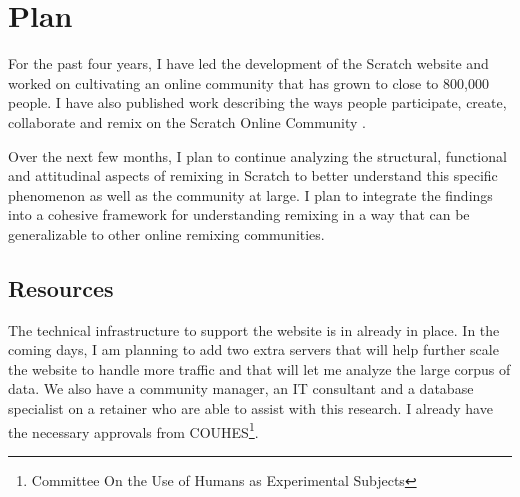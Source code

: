 \chapter{Plan}

For the past four years, I have led the development of the Scratch website and worked on cultivating an online community that has grown to close to 800,000 people.
I have also published work describing the ways people participate, create, collaborate and remix on the Scratch Online Community \citep{monroy-hernandez_scratchr:_2007, monroy-hernandez_empowering_2008, monroy-hernandez_computers_2011, hill_responses_2010, aragon_tale_2009, nickerson_appropriation_2011, brennan_making_2010}.

Over the next few months, I plan to continue analyzing the structural, functional and attitudinal aspects of remixing in Scratch to better understand this specific phenomenon as well as the community at large.
I plan to integrate the findings into a cohesive framework for understanding remixing in a way that can be generalizable to other online remixing communities.

\section{Resources}
The technical infrastructure to support the website is in already in place.
In the coming days, I am planning to add two extra servers that will help further scale the website to handle more traffic and that will let me analyze the large corpus of data.
We also have a community manager, an IT consultant and a database specialist on a retainer who are able to assist with this research.
I already have the necessary approvals from COUHES\footnote{Committee On the Use of Humans as Experimental Subjects}.

